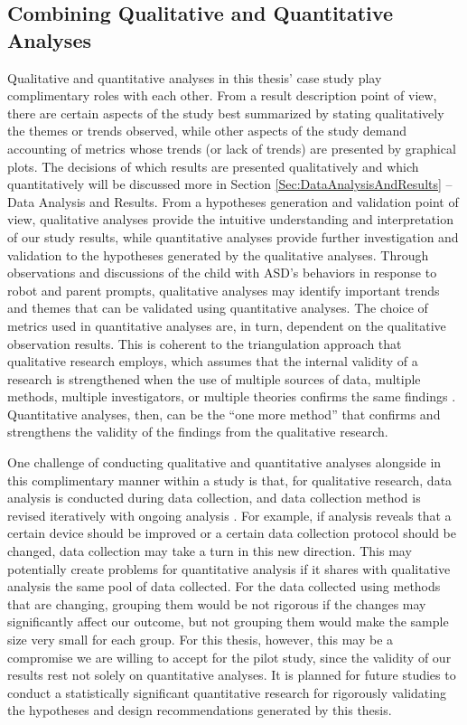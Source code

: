 \subsection{Combining Qualitative and Quantitative Analyses}
Qualitative and quantitative analyses in this thesis' case study play complimentary roles with each other.  From a result description point of view, there are certain aspects of the study best summarized by stating qualitatively the themes or trends observed, while other aspects of the study demand accounting of metrics whose trends (or lack of trends) are presented by graphical plots.  The decisions of which results are presented qualitatively and which quantitatively will be discussed more in Section \ref{Sec:DataAnalysisAndResults} -- Data Analysis and Results.  From a hypotheses generation and validation point of view, qualitative analyses provide the intuitive understanding and interpretation of our study results, while quantitative analyses provide further investigation and validation to the hypotheses generated by the qualitative analyses.  Through observations and discussions of the child with ASD's behaviors in response to robot and parent prompts, qualitative analyses may identify important trends and themes that can be validated using quantitative analyses.  The choice of metrics used in quantitative analyses are, in turn, dependent on the qualitative observation results.  This is coherent to the triangulation approach that qualitative research employs, which assumes that the internal validity of a research is strengthened when the use of multiple sources of data, multiple methods, multiple investigators, or multiple theories confirms the same findings \cite{merriam2014qualitative}.  Quantitative analyses, then, can be the ``one more method'' that confirms and strengthens the validity of the findings from the qualitative research.

One challenge of conducting qualitative and quantitative analyses alongside in this complimentary manner within a study is that, for qualitative research, data analysis is conducted during data collection, and data collection method is revised iteratively with ongoing analysis \cite{merriam2014qualitative}.  For example, if analysis reveals that a certain device should be improved or a certain data collection protocol should be changed, data collection may take a turn in this new direction.  This may potentially create problems for quantitative analysis if it shares with qualitative analysis the same pool of data collected.  For the data collected using methods that are changing, grouping them would be not rigorous if the changes may significantly affect our outcome, but not grouping them would make the sample size very small for each group.  For this thesis, however, this may be a compromise we are willing to accept for the pilot study, since the validity of our results rest not solely on quantitative analyses.  It is planned for future studies to conduct a statistically significant quantitative research for rigorously validating the hypotheses and design recommendations generated by this thesis.

